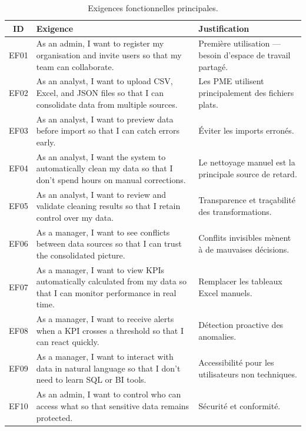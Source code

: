 \begin{table}[h!]
\centering
\caption{Exigences fonctionnelles principales.}
\label{tab:exigences}
\small
\begin{tabular}{|c|p{4.5cm}|p{4.5cm}|}
\hline
\textbf{ID} & \textbf{Exigence} & \textbf{Justification} \\
\hline
EF01 & As an admin, I want to register my organisation
      and invite users so that my team can collaborate. & Première utilisation — besoin d'espace de travail partagé. \\
\hline
EF02 & As an analyst, I want to upload CSV, Excel, and JSON files
      so that I can consolidate data from multiple sources. & Les PME utilisent principalement des fichiers plats. \\
\hline
EF03 & As an analyst, I want to preview data before import
      so that I can catch errors early. & Éviter les imports erronés. \\
\hline
EF04 & As an analyst, I want the system to automatically clean
      my data so that I don't spend hours on manual corrections. & Le nettoyage manuel est la principale source de retard. \\
\hline
EF05 & As an analyst, I want to review and validate cleaning results
      so that I retain control over my data. & Transparence et traçabilité des transformations. \\
\hline
EF06 & As a manager, I want to see conflicts between data sources
      so that I can trust the consolidated picture. & Conflits invisibles mènent à de mauvaises décisions. \\
\hline
EF07 & As a manager, I want to view KPIs automatically calculated
      from my data so that I can monitor performance in real time. & Remplacer les tableaux Excel manuels. \\
\hline
EF08 & As a manager, I want to receive alerts when a KPI
      crosses a threshold so that I can react quickly. & Détection proactive des anomalies. \\
\hline
EF09 & As a manager, I want to interact with data in natural language
      so that I don't need to learn SQL or BI tools. & Accessibilité pour les utilisateurs non techniques. \\
\hline
EF10 & As an admin, I want to control who can access what
      so that sensitive data remains protected. & Sécurité et conformité. \\
\hline
\end{tabular}
\end{table}


